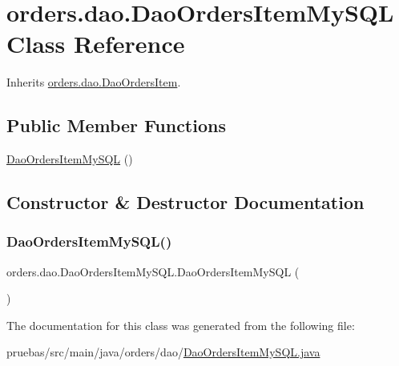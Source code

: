 \hypertarget{classorders_1_1dao_1_1_dao_orders_item_my_s_q_l}{}\section{orders.\+dao.\+Dao\+Orders\+Item\+My\+S\+QL Class Reference}
\label{classorders_1_1dao_1_1_dao_orders_item_my_s_q_l}


Inherits \mbox{\hyperlink{interfaceorders_1_1dao_1_1_dao_orders_item}{orders.\+dao.\+Dao\+Orders\+Item}}.

\subsection*{Public Member Functions}
\begin{DoxyCompactItemize}
\item 
\mbox{\hyperlink{classorders_1_1dao_1_1_dao_orders_item_my_s_q_l_a102cfac39f0ea21a7e9672803ce6895c}{Dao\+Orders\+Item\+My\+S\+QL}} ()
\end{DoxyCompactItemize}


\subsection{Constructor \& Destructor Documentation}
\mbox{\label{classorders_1_1dao_1_1_dao_orders_item_my_s_q_l_a102cfac39f0ea21a7e9672803ce6895c}} 
\subsubsection{\texorpdfstring{Dao\+Orders\+Item\+My\+S\+Q\+L()}{DaoOrdersItemMySQL()}}
{\footnotesize\ttfamily orders.\+dao.\+Dao\+Orders\+Item\+My\+S\+Q\+L.\+Dao\+Orders\+Item\+My\+S\+QL (\begin{DoxyParamCaption}{ }\end{DoxyParamCaption})}



The documentation for this class was generated from the following file\+:\begin{DoxyCompactItemize}
\item 
pruebas/src/main/java/orders/dao/\mbox{\hyperlink{_dao_orders_item_my_s_q_l_8java}{Dao\+Orders\+Item\+My\+S\+Q\+L.\+java}}\end{DoxyCompactItemize}
